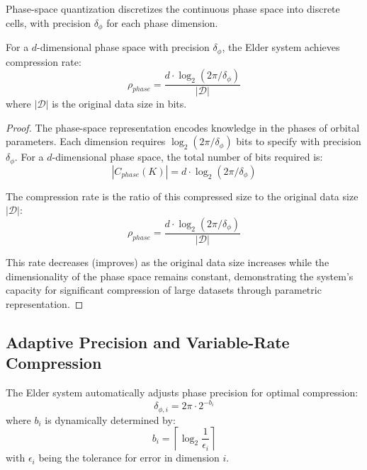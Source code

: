 \begin{definition}
Phase-space quantization discretizes the continuous phase space into discrete cells, with precision $\delta_{\phi}$ for each phase dimension.
\end{definition}

\begin{theorem}
For a $d$-dimensional phase space with precision $\delta_{\phi}$, the Elder system achieves compression rate:
\begin{equation}
\rho_{phase} = \frac{d \cdot \log_2(2\pi/\delta_{\phi})}{|\mathcal{D}|}
\end{equation}
where $|\mathcal{D}|$ is the original data size in bits.
\end{theorem}

\begin{proof}
The phase-space representation encodes knowledge in the phases of orbital parameters. Each dimension requires $\log_2(2\pi/\delta_{\phi})$ bits to specify with precision $\delta_{\phi}$. For a $d$-dimensional phase space, the total number of bits required is:
\begin{equation}
|C_{phase}(K)| = d \cdot \log_2(2\pi/\delta_{\phi})
\end{equation}

The compression rate is the ratio of this compressed size to the original data size $|\mathcal{D}|$:
\begin{equation}
\rho_{phase} = \frac{d \cdot \log_2(2\pi/\delta_{\phi})}{|\mathcal{D}|}
\end{equation}

This rate decreases (improves) as the original data size increases while the dimensionality of the phase space remains constant, demonstrating the system's capacity for significant compression of large datasets through parametric representation.
\end{proof}

\subsection{Adaptive Precision and Variable-Rate Compression}

\begin{theorem}
The Elder system automatically adjusts phase precision for optimal compression:
\begin{equation}
\delta_{\phi,i} = 2\pi \cdot 2^{-b_i}
\end{equation}
where $b_i$ is dynamically determined by:
\begin{equation}
b_i = \left\lceil \log_2 \frac{1}{\epsilon_i} \right\rceil
\end{equation}
with $\epsilon_i$ being the tolerance for error in dimension $i$.
\end{theorem}

